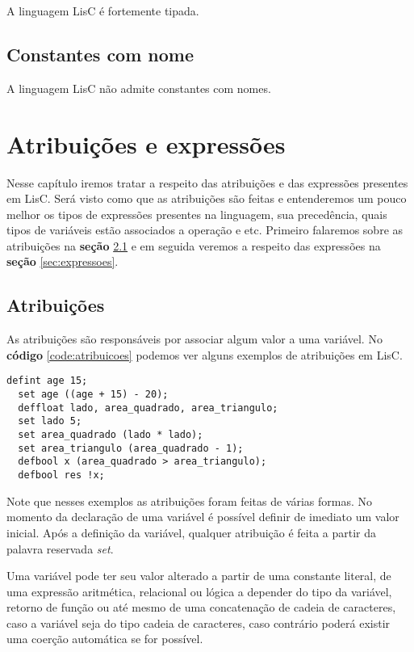\documentclass[
  12pt,				%
  oneside,			%
  a4paper,			%
  english,			%
  french,				%
  spanish,			%
  brazil,				%
]{abntex2}
\begin{document}
A linguagem LisC é fortemente tipada.

\section{Constantes com nome}
\label{sec:constantes-com-nome}

A linguagem LisC não admite constantes com nomes.

\chapter{Atribuições e expressões}
\label{cha:atribuicoes-e-expressoes}

Nesse capítulo iremos tratar a respeito das atribuições e das
expressões presentes em LisC. Será visto como que as atribuições são
feitas e entenderemos um pouco melhor os tipos de expressões presentes
na linguagem, sua precedência, quais tipos de variáveis estão
associados a operação e etc. Primeiro falaremos sobre as atribuições
na \textbf{seção} \ref{sec:atribuicoes} e em seguida veremos a respeito das
expressões na \textbf{seção} \ref{sec:expressoes}.

\section{Atribuições}
\label{sec:atribuicoes}

As atribuições são responsáveis por associar algum valor a uma
variável. No \textbf{código} \ref{code:atribuicoes} podemos ver alguns
exemplos de atribuições em LisC.

\begin{lstlisting}[label=code:atribuicoes,caption=Exemplos de
  atribuições.]
  defint age 15;
  set age ((age + 15) - 20);
  deffloat lado, area_quadrado, area_triangulo;
  set lado 5;
  set area_quadrado (lado * lado);
  set area_triangulo (area_quadrado - 1);
  defbool x (area_quadrado > area_triangulo);
  defbool res !x;
\end{lstlisting}

Note que nesses exemplos as atribuições foram feitas de várias
formas. No momento da declaração de uma variável é possível definir de
imediato um valor inicial. Após a definição da variável, qualquer
atribuição é feita a partir da palavra reservada \emph{set}.

Uma variável pode ter seu valor alterado a partir de uma constante
literal, de uma expressão aritmética, relacional ou lógica a
depender do tipo da variável, retorno de função ou até mesmo de uma
concatenação de cadeia de caracteres, caso a variável seja do tipo
cadeia de caracteres, caso contrário poderá existir uma coerção
automática se for possível.
\end{document}
